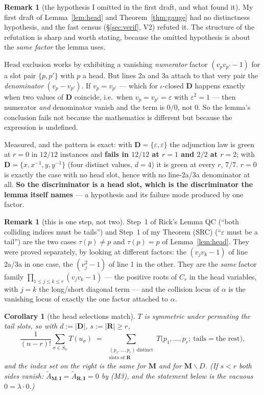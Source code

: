 \documentclass[11pt]{article}
\newtheorem{cor}[thm]{Corollary}
\theoremstyle{definition}
\newtheorem{rem}[thm]{Remark}
\newcommand{\At}{\widetilde{A}}
\newcommand{\bM}{\mathbf{M}}
\newcommand{\bI}{\mathbf{I}}
\newcommand{\bD}{\mathbf{D}}
\newcommand{\bR}{\mathbf{R}}
\newcommand{\sm}{\smallsetminus}
\begin{document}
\begin{rem}[the hypothesis I omitted in the first draft, and what found it]
\label{rem:distinct}
My first draft of Lemma~\ref{lem:head} and Theorem~\ref{thm:gauge} had no
distinctness hypothesis, and the fast census (\S\ref{sec:verif}, V2) refuted it.
The structure of the refutation is sharp and worth stating, because the omitted
hypothesis is about the \emph{same factor} the lemma uses.

Head exclusion works by exhibiting a vanishing \emph{numerator} factor
$(v_pv_{p'}-1)$ for a slot pair $\{p,p'\}$ with $p$ a head.  But lines 2a and 3a
attach to that very pair the \emph{denominator} $(v_p-v_{p'})$.  If
$v_p=v_{p'}$ --- which for $\iota$-closed $\bD$ happens exactly when two values of
$\bD$ coincide, i.e.\ when $v_p=v_{p'}=\varepsilon$ with $\varepsilon^2=1$ --- then
numerator \emph{and} denominator vanish and the term is $0/0$, not $0$.  So the
lemma's conclusion fails not because the mathematics is different but because the
expression is undefined.

Measured, and the pattern is exact: with $\bD=\{\varepsilon,\varepsilon\}$ the
adjunction law is green at $r=0$ in $12/12$ instances and \textbf{fails in
$12/12$ at $r=1$ and $2/2$ at $r=2$}; with $\bD=\{x,x^{-1},y,y^{-1}\}$
(four distinct values, $d=4$) it is green at every $r$, $7/7$.  $r=0$ is exactly
the case with no head slot, hence with no line-2a/3a denominator at all.
\textbf{So the discriminator is a head slot, which is the discriminator the lemma
itself names} --- a hypothesis and its failure mode produced by one factor.
\end{rem}

\begin{rem}[this is one step, not two]
Step~1 of Rick's Lemma QC (``both colliding indices must be tails'') and Step~1
of my Theorem (SRC) (``$\varepsilon$ must be a tail'') are the two cases
$\tau(p)\ne p$ and $\tau(p)=p$ of Lemma~\ref{lem:head}.  They were proved
separately, by looking at different factors: the $(v_jv_k-1)$ of line 2a/3a in
one case, the $(v_j^2-1)$ of line 1 in the other.  They are the \emph{same}
factor family $\prod_{1\le j\le k\le r}(v_jv_k-1)$ --- the positive roots of
$C_r$ in the head variables, with $j=k$ the long/short diagonal term --- and the
collision locus of $\alpha$ is the vanishing locus of exactly the one factor
attached to $\alpha$.
\end{rem}

\begin{cor}[the head selections match]\label{cor:heads}
$T$ is symmetric under permuting the tail slots, so with $d:=|\bD|$,
$s:=|\bR|\ge r$,
\[
  \frac{1}{(n-r)!}\sum_{\sigma\in S_n}T(u_\sigma)
  \;=\;\sum_{\substack{(p_1,\dots,p_r)\ \text{distinct}\\ \text{slots of }\bR}}
      T\bigl(p_1,\dots,p_r;\ \text{tails}=\text{the rest}\bigr),
\]
and the index set on the right is the \emph{same} for $\bM$ and for
$\bM\sm D$.  (If $s<r$ both sides vanish: $\At_{\bM,\bI}=\At_{\bR,\bI}=0$ by
\textup{(M3)}, and the statement below is the vacuous $0=\lambda\cdot0$.)
\end{cor}
\end{document}
